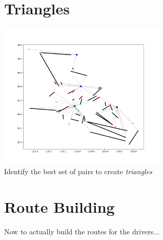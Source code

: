 \documentclass{beamer}
\begin{document}
\section{Triangles}
\begin{frame}
	\begin{center}
		\includegraphics[width=8cm]{triangles.png}\\
		Identify the best set of pairs to create \emph{triangles}
	\end{center}
\end{frame}

\section{Route Building}
\begin{frame}
Now to actually build the routes for the drivers...

\end{frame}
\end{document}
